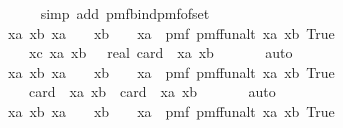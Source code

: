 \begin{isabellebody}
\ \ \ \ \isamarkupfalse%
\ {\isacharparenleft}{\kern0pt}simp\ add{\isacharcolon}{\kern0pt}\ pmf{\isacharunderscore}{\kern0pt}bind{\isacharunderscore}{\kern0pt}pmf{\isacharunderscore}{\kern0pt}of{\isacharunderscore}{\kern0pt}set{\isacharparenright}{\kern0pt}\isanewline
\ \ \isamarkupfalse%
\ \isamarkupfalse%
\ {\isachardoublequoteopen}{\isasymAnd}xa\ xb{\isachardot}{\kern0pt}\ xa\ {\isasymin}\ {\isacharquery}{\kern0pt}{\isasymK}\ {\isasymLongrightarrow}\ xb\ {\isasymin}\ {\isacharquery}{\kern0pt}{\isasymK}\ {\isacharminus}{\kern0pt}\ {\isacharbraceleft}{\kern0pt}xa{\isacharbraceright}{\kern0pt}\ {\isasymLongrightarrow}\ pmf\ {\isacharparenleft}{\kern0pt}{\isacharquery}{\kern0pt}pmf{\isacharunderscore}{\kern0pt}fun{\isacharunderscore}{\kern0pt}{}alt\ xa\ xb{\isacharparenright}{\kern0pt}\ True\ {\isacharequal}{\kern0pt}\ \isanewline
\ \ \ \ {\isacharparenleft}{\kern0pt}{\isasymSum}xc{\isasymin}{\isacharparenleft}{\kern0pt}{\isacharquery}{\kern0pt}{\isasymZ}\ xa\ xb{\isacharparenright}{\kern0pt}{\isachardot}{\kern0pt}\ {}{\isacharparenright}{\kern0pt}\ {\isacharslash}{\kern0pt}\ real\ {\isacharparenleft}{\kern0pt}card\ {\isacharparenleft}{\kern0pt}{\isacharquery}{\kern0pt}{\isasymZ}\ xa\ xb{\isacharparenright}{\kern0pt}{\isacharparenright}{\kern0pt}{\isachardoublequoteclose}\ \isanewline
\ \ \ \ \isamarkupfalse%
\ auto\isanewline
\ \ \isamarkupfalse%
\ \isamarkupfalse%
\ {\isachardoublequoteopen}{\isasymAnd}xa\ xb{\isachardot}{\kern0pt}\ xa\ {\isasymin}\ {\isacharquery}{\kern0pt}{\isasymK}\ {\isasymLongrightarrow}\ xb\ {\isasymin}\ {\isacharquery}{\kern0pt}{\isasymK}\ {\isacharminus}{\kern0pt}\ {\isacharbraceleft}{\kern0pt}xa{\isacharbraceright}{\kern0pt}\ {\isasymLongrightarrow}\ pmf\ {\isacharparenleft}{\kern0pt}{\isacharquery}{\kern0pt}pmf{\isacharunderscore}{\kern0pt}fun{\isacharunderscore}{\kern0pt}{}alt\ xa\ xb{\isacharparenright}{\kern0pt}\ True\ {\isacharequal}{\kern0pt}\ \isanewline
\ \ \ \ {\isacharparenleft}{\kern0pt}card\ {\isacharparenleft}{\kern0pt}{\isacharquery}{\kern0pt}{\isasymZ}\ xa\ xb{\isacharparenright}{\kern0pt}{\isacharparenright}{\kern0pt}\ {\isacharslash}{\kern0pt}\ {\isacharparenleft}{\kern0pt}card\ {\isacharparenleft}{\kern0pt}{\isacharquery}{\kern0pt}{\isasymZ}\ xa\ xb{\isacharparenright}{\kern0pt}{\isacharparenright}{\kern0pt}{\isachardoublequoteclose}\ \isanewline
\ \ \ \ \isamarkupfalse%
\ auto\isanewline
\ \ \isamarkupfalse%
\ \isamarkupfalse%
\ {\isachardoublequoteopen}{\isasymAnd}xa\ xb{\isachardot}{\kern0pt}\ xa\ {\isasymin}\ {\isacharquery}{\kern0pt}{\isasymK}\ {\isasymLongrightarrow}\ xb\ {\isasymin}\ {\isacharquery}{\kern0pt}{\isasymK}\ {\isacharminus}{\kern0pt}\ {\isacharbraceleft}{\kern0pt}xa{\isacharbraceright}{\kern0pt}\ {\isasymLongrightarrow}\ pmf\ {\isacharparenleft}{\kern0pt}{\isacharquery}{\kern0pt}pmf{\isacharunderscore}{\kern0pt}fun{\isacharunderscore}{\kern0pt}{}alt\ xa\ xb{\isacharparenright}{\kern0pt}\ True\ {\isacharequal}{\kern0pt}\ {}{\isachardoublequoteclose}\ \isanewline

\end{isabellebody}
